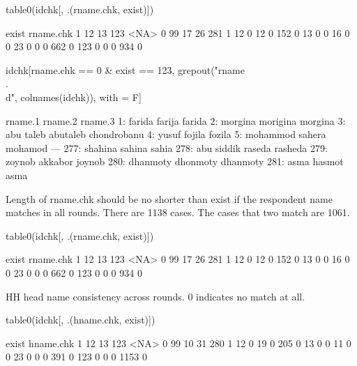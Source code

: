 \begin{Schunk}
\begin{Sinput}
table0(idchk[, .(rname.chk, exist)])
\end{Sinput}
\begin{Soutput}
         exist
rname.chk   1  12  13 123 <NA>
      0    99  17  26 281    1
      12    0  12   0 152    0
      13    0   0  16   0    0
      23    0   0   0 662    0
      123   0   0   0 934    0
\end{Soutput}
\begin{Sinput}
idchk[rname.chk == 0 & exist == 123, 
	grepout("rname\\.\\d", colnames(idchk)), with = F]
\end{Sinput}
\begin{Soutput}
        rname.1  rname.2     rname.3
  1:     farida   farija      farida
  2:    morgina morigina     morgina
  3:  abu taleb abutaleb chondrobanu
  4:      yusuf   fojila      fozila
  5:   mohammod   sahera     mohamod
 ---                                
277:    shahina   sahina       sahia
278: abu siddik   raseda     rasheda
279:     zoynob  akkabor      joynob
280:   dhanmoty dhonmoty    dhanmoty
281:       asma   hasmot        asma
\end{Soutput}
\end{Schunk}
Length of \textsf{rname.chk} should be no shorter than \textsf{exist} if the respondent name matches in all rounds. There are 1138 cases. The cases that two match are 1061. 
\begin{Schunk}
\begin{Sinput}
table0(idchk[, .(rname.chk, exist)])
\end{Sinput}
\begin{Soutput}
         exist
rname.chk   1  12  13 123 <NA>
      0    99  17  26 281    1
      12    0  12   0 152    0
      13    0   0  16   0    0
      23    0   0   0 662    0
      123   0   0   0 934    0
\end{Soutput}
\end{Schunk}
HH head name consistency across rounds. 0 indicates no match at all.
\begin{Schunk}
\begin{Sinput}
table0(idchk[, .(hname.chk, exist)])
\end{Sinput}
\begin{Soutput}
         exist
hname.chk    1   12   13  123 <NA>
      0     99   10   31  280    1
      12     0   19    0  205    0
      13     0    0   11    0    0
      23     0    0    0  391    0
      123    0    0    0 1153    0
\end{Soutput}
\end{Schunk}

